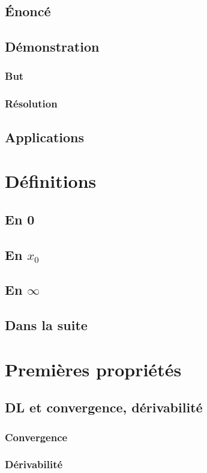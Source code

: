 \documentclass[12pt,a4paper,french]{book}
\begin{document}
		\subsection{Énoncé}
		\subsection{Démonstration}
			\subsubsection{But}
			\subsubsection{Résolution}
		\subsection{Applications}
	\section{Définitions}
		\subsection{En 0}
		\subsection{En $x_0$}
		\subsection{En $\infty$}
		\subsection{Dans la suite}
	\section{Premières propriétés}
		\subsection{DL et convergence, dérivabilité}
			\subsubsection{Convergence}
			\subsubsection{Dérivabilité}
\end{document}
